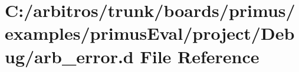 \hypertarget{boards_2primus_2examples_2primus_eval_2project_2_debug_2arb__error_8d}{\section{C\-:/arbitros/trunk/boards/primus/examples/primus\-Eval/project/\-Debug/arb\-\_\-error.d File Reference}
\label{boards_2primus_2examples_2primus_eval_2project_2_debug_2arb__error_8d}
}

